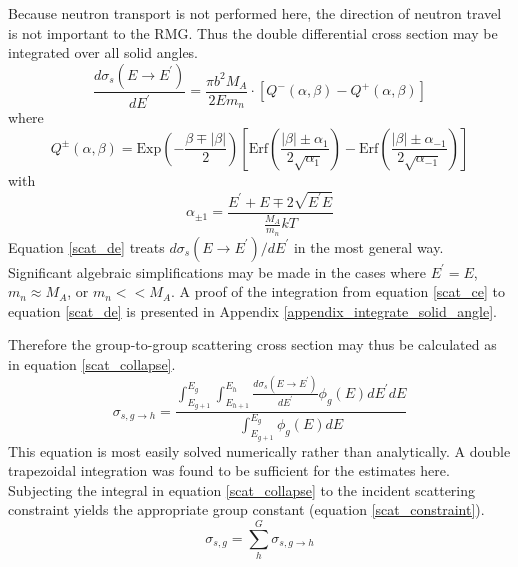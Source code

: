 Because neutron transport is not performed here, the direction of neutron travel is not
important to the RMG. Thus the double differential cross section may be integrated over all solid angles.
\begin{equation}
\label{scat_de}
\frac{d\sigma_s(E\to E^\prime)}{dE^\prime} = \frac{\pi b^2 M_A}{2Em_n} \cdot 
            \left[Q^-(\alpha, \beta) - Q^+(\alpha, \beta)\right]
\end{equation}
where 
\begin{equation}
\label{scat_q}
Q^\pm(\alpha, \beta) = \mbox{Exp}\left(-\frac{\beta \mp |\beta|}{2}\right) 
                       \left[\mbox{Erf}\left(\frac{|\beta| \pm \alpha_1}{2\sqrt{\alpha_1}}\right) - 
                             \mbox{Erf}\left(\frac{|\beta| \pm \alpha_{-1}}{2\sqrt{\alpha_{-1}}}\right)\right]
\end{equation}
with 
\begin{equation}
\label{scat_alpha_pm}
\alpha_{\pm 1} = \frac{E^\prime + E \mp 2\sqrt{E^\prime E}}{\frac{M_A}{m_n}kT}
\end{equation}
Equation \ref{scat_de} treats $d\sigma_s(E\to E^\prime)/dE^\prime$ in the most general way.  
Significant algebraic simplifications may be made in the cases where $E^\prime = E$, $m_n \approx M_A$, 
or $m_n << M_A$.  A proof of the integration from equation \ref{scat_ce} to equation \ref{scat_de} is 
presented in Appendix \ref{appendix_integrate_solid_angle}.


Therefore the group-to-group scattering cross section may thus be calculated as in equation \ref{scat_collapse}.
\begin{equation}
\label{scat_collapse}
\sigma_{s,g\to h} = \frac{\int_{E_{g+1}}^{E_g} \int_{E_{h+1}}^{E_h} \frac{d\sigma_s(E\to E^\prime)}{dE^\prime}  \phi_g(E) dE^\prime dE}
                     {\int_{E_{g+1}}^{E_g} \phi_g(E) dE}
\end{equation}
This equation is most easily solved numerically rather than analytically.
A double trapezoidal integration was found to be sufficient for the estimates here.
Subjecting the integral in equation \ref{scat_collapse} 
to the incident scattering constraint yields the appropriate group constant (equation \ref{scat_constraint}).
\begin{equation}
\label{scat_constraint}
\sigma_{s,g} = \sum_h^G \sigma_{s,g\to h}
\end{equation}






